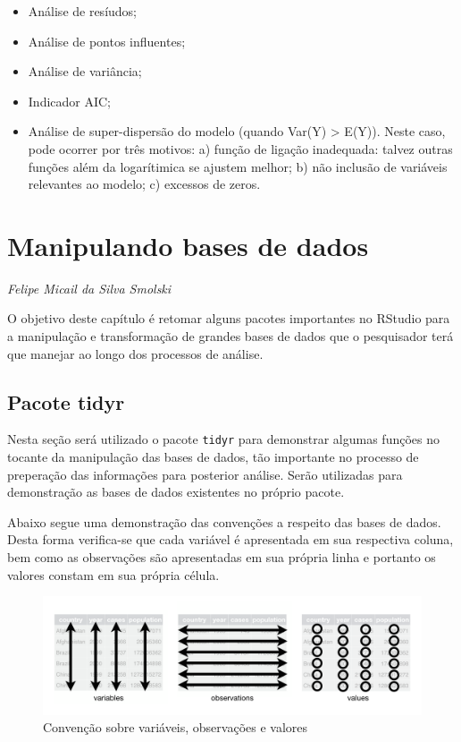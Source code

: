 \documentclass[12pt,brazil,oneside]{book}
\providecommand{\tightlist}{%
  \setlength{\itemsep}{0pt}\setlength{\parskip}{0pt}}
\begin{document}
\begin{itemize}
\tightlist
\item
  Análise de resíudos;
\item
  Análise de pontos influentes;
\item
  Análise de variância;
\item
  Indicador AIC;
\item
  Análise de super-dispersão do modelo (quando Var(Y) \textgreater{} E(Y)). Neste caso, pode ocorrer por três motivos: a) função de ligação inadequada: talvez outras funções além da logarítimica se ajustem melhor; b) não inclusão de variáveis relevantes ao modelo; c) excessos de zeros.
\end{itemize}

\hypertarget{manipulando-bases-de-dados}{%
\chapter{Manipulando bases de dados}\label{manipulando-bases-de-dados}}

\emph{Felipe Micail da Silva Smolski}

O objetivo deste capítulo é retomar alguns pacotes importantes no RStudio para a
manipulação e transformação de grandes bases de dados que o pesquisador terá que manejar ao longo dos processos de análise.

\hypertarget{pacote-tidyr}{%
\section{Pacote tidyr}\label{pacote-tidyr}}

Nesta seção será utilizado o pacote \texttt{tidyr} para demonstrar algumas funções no tocante da manipulação das bases de dados, tão importante no processo de preperação das informações para posterior análise. Serão utilizadas para demonstração as bases de dados existentes no próprio pacote.

Abaixo segue uma demonstração das convenções a respeito das bases de dados. Desta forma verifica-se que cada variável é apresentada em sua respectiva coluna, bem como as observações são apresentadas em sua própria linha e portanto os valores constam em sua própria célula.

\begin{figure}[H]

{\centering \includegraphics[width=0.8\linewidth]{tidy-1} 

}

\caption{Convenção sobre variáveis, observações e valores}\label{fig:dados}
\end{figure}
\end{document}
